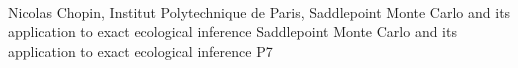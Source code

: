     \\\hline
{}	%
{}		%
{Nicolas Chopin, Institut Polytechnique de Paris, Saddlepoint Monte Carlo and its application to exact ecological inference}	%
{Saddlepoint Monte Carlo and its application to exact ecological inference}		%
{P7}		%
\\\hline
